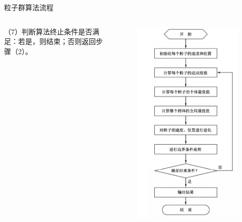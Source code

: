\documentclass[xcolor=table,dvipsnames,svgnames,aspectratio=169,fontset=ubuntu]{ctexbeamer}
\begin{document}
\begin{frame}{粒子群算法流程}
\begin{columns}
（7）判断算法终止条件是否满足：若是，则结束；否则返回步骤（2）。
\begin{figure}
  \centering
  \includegraphics[width=\textwidth]{粒子群.png}
\end{figure}
\end{columns}
\end{frame}
\end{document}
